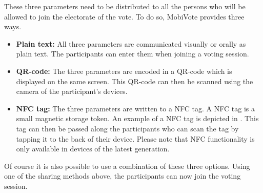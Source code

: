 \documentclass[numbers=noenddot, abstract=on, a4paper, headsepline,
footsepline, oneside, draft=off]{scrreprt}
\begin{document}
These three parameters need to be distributed to all the persons who will be
allowed to join the electorate of the vote. To do so, MobiVote provides three
ways.
\begin{itemize}
  \item \textbf{Plain text:} All three parameters are communicated visually or
  orally as plain text. The participants can enter them when joining a voting
  session.
  \item \textbf{QR-code:} The three parameters are encoded in a QR-code which is
  displayed on the same screen. This QR-code can then be scanned using the
  camera of the participant's devices.
  \item \textbf{NFC tag:} The three parameters are written to a NFC tag. A NFC
  tag is a small magnetic storage token. An example of a NFC tag is depicted in
  . This tag can then be passed along the participants
  who can scan the tag by tapping it to the back of their device. Please note
  that NFC functionality is only available in devices of the latest generation.
\end{itemize}
Of course it is also possible to use a combination of these three options. Using
one of the sharing methods above, the participants can now join the voting
session.
\end{document}
